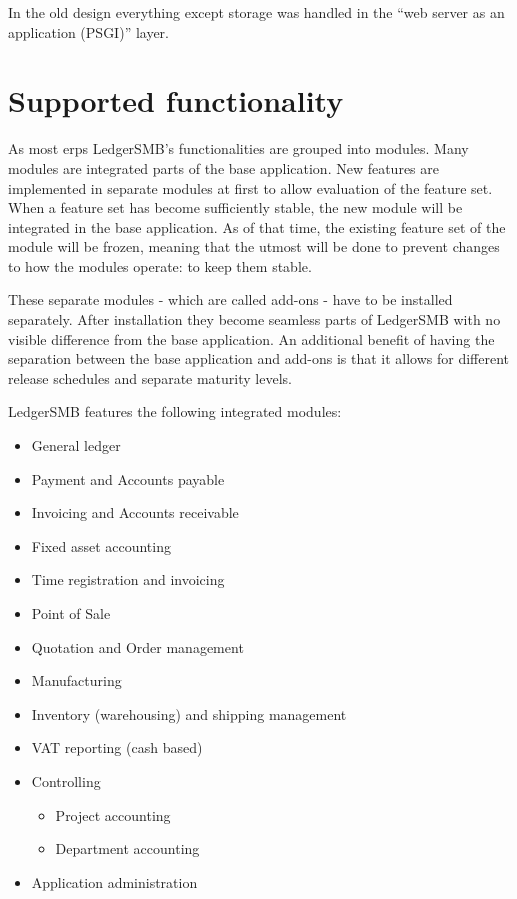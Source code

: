In the old design everything except storage was handled in the ``web server as an
application (\gls{PSGI})'' layer.


\section{Supported functionality}
\label{sec-ledgersmb-modules}
As most \glspl{erp} LedgerSMB's functionalities are grouped into modules.
Many modules are integrated parts of the base application.  New features
are implemented in separate modules at first to allow evaluation of the
feature set. When a feature set has become sufficiently stable, the new
module will be integrated in the base application. As of that time, the
existing feature set of the module will be frozen, meaning that the utmost
will be done to prevent changes to how the modules operate: to keep them
stable.

These separate modules - which are called \glspl{add-on} - have to be
installed separately. After installation they become seamless parts of
LedgerSMB with no visible difference from the base application. An
additional benefit of having the separation between the base application
and \glspl{add-on} is that it allows for different release schedules
and separate maturity levels.


LedgerSMB \ledgerSMBversion features the following integrated modules:

\begin{itemize}
\item General ledger
\item Payment and Accounts payable
\item Invoicing and Accounts receivable
\item Fixed asset accounting
\item Time registration and invoicing
\item Point of Sale
\item Quotation and Order management
\item Manufacturing
\item Inventory (warehousing) and shipping management
\item VAT reporting (cash based)
\item Controlling
\begin{itemize}
\item Project accounting
\item Department accounting
\end{itemize}
\item Application administration
\end{itemize}

